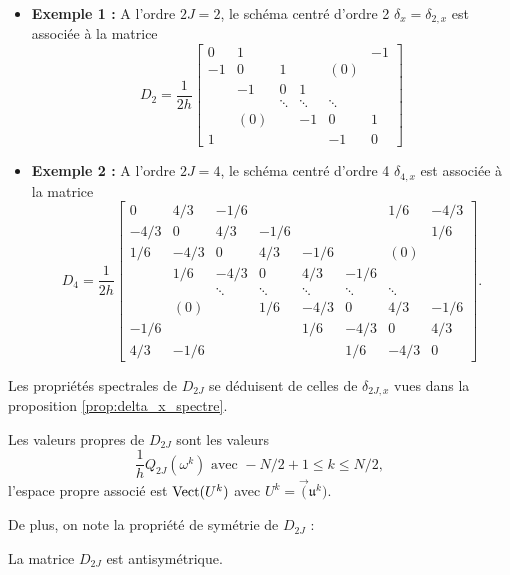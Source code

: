 \begin{itemize}
\item \textbf{Exemple 1 :} A l'ordre $2J=2$,  le schéma centré d'ordre 2 $\delta_x = \delta_{2,x}$ est associée à la matrice
\begin{equation}
D_2 = \dfrac{1}{2h}
\begin{bmatrix}
0 & 1 &   &   &   & -1 \\ 
-1 & 0 & 1 &   & (0) &   \\ 
  & -1 & 0 & 1 &   &   \\ 
  &   & \ddots & \ddots & \ddots &   \\ 
  & (0) &   & -1 & 0 & 1 \\ 
1 &   &   &   & -1 & 0
\end{bmatrix} 
\label{eq:matrice_D2}
\end{equation}

\item \textbf{Exemple 2 :} A l'ordre $2J=4$,  le schéma centré d'ordre 4 $\delta_{4,x}$ est associée à la matrice
\begin{equation}
D_4 = \dfrac{1}{2h}
\begin{bmatrix}
0 & 4/3 & -1/6 &   &   &   & 1/6 & -4/3 \\ 
-4/3 & 0 & 4/3 & -1/6 &   &   &   & 1/6 \\ 
1/6 & -4/3 & 0 & 4/3 & -1/6 &  & (0) &   \\ 
  & 1/6 & -4/3 & 0 & 4/3 & -1/6 &   &   \\ 
  &   & \ddots & \ddots & \ddots & \ddots & \ddots &   \\ 
  &  (0)& & 1/6 & -4/3 & 0 & 4/3 & -1/6 \\ 
-1/6 &   &   &   & 1/6 & -4/3 & 0 & 4/3 \\ 
4/3 & -1/6 &   &   &   & 1/6 & -4/3 & 0
\end{bmatrix}.
\end{equation}
\end{itemize}

Les propriétés spectrales de $D_{2J}$ se déduisent de celles de $\delta_{2J,x}$ vues dans la proposition \ref{prop:delta_x_spectre}.
\begin{proposition}
Les valeurs propres de $D_{2J}$ sont les valeurs 
\begin{equation}
\dfrac{1}{h}Q_{2J}(\omega^k) \text{ avec }-N/2 +1 \leq k \leq N/2,
\end{equation}
l'espace propre associé est $\text{Vect} (U^k)$ avec $U^k = \vec (\mathfrak{u}^k)$.
\end{proposition}
De plus, on note la propriété de symétrie de $D_{2J}$ :
\begin{proposition}
La matrice $D_{2J}$ est antisymétrique.
\end{proposition}

